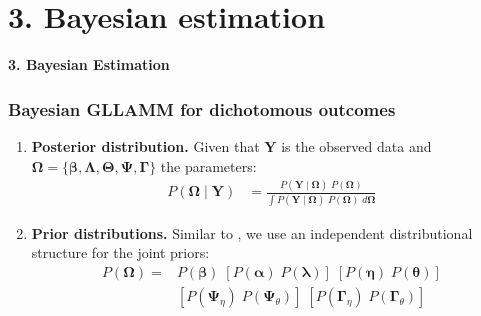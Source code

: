 \documentclass[arial,12pt,xcolor=dvipsnames]{beamer}
\begin{document}
\section{3. Bayesian estimation}
%
\begin{frame}
	\textbf{3. Bayesian Estimation}
\end{frame}
%
\begin{frame}
	\frametitle{Bayesian GLLAMM for dichotomous outcomes}
	\begin{enumerate}
		\item \textbf{Posterior distribution.}
		Given that $\mathbf{Y}$ is the observed data and $\pmb{\Omega} = \{ \pmb{\beta}, \pmb{\Lambda}, \pmb{\Theta}, \pmb{\Psi}, \pmb{\Gamma} \}$ the parameters:
		\begin{equation} \label{eq:posterior1}
			\begin{split}
				P(\pmb{\Omega} \; | \; \mathbf{Y}) &= \frac{ P( \mathbf{Y} \; | \; \pmb{\Omega} ) \; P( \pmb{\Omega} ) }{ \int P( \mathbf{Y} \; | \; \pmb{\Omega} ) \; P( \pmb{\Omega} ) \; d\pmb{\Omega} }
			\end{split}
		\end{equation}
		\item \textbf{Prior distributions.}
		Similar to \citet{Patz_et_al_1999}, we use an independent distributional structure for the joint priors:
		\begin{equation}
			\begin{split}
				P( \pmb{\Omega} ) =& P( \pmb{\beta} ) \; \left[ P( \pmb{\alpha} ) \; P( \pmb{\lambda} ) \right] \; \left[ P( \pmb{\eta} ) \; P( \pmb{\theta} ) \right] \\
				& \left[ P( \pmb{\Psi}_{\eta} ) \; P( \pmb{\Psi}_{\theta} ) \right] \; \left[ P( \pmb{\Gamma}_{\eta} ) \; P( \pmb{\Gamma}_{\theta} ) \right]
			\end{split}
		\end{equation}
	\end{enumerate}
\end{frame}
%
\end{document}
